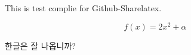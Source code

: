\documentclass{article}
\begin{document}
This is test complie for Github-Sharelatex. 

\[ f(x) = 2 x^2 + \alpha \] 

한글은 잘 나옵니까? 
\end{document}
